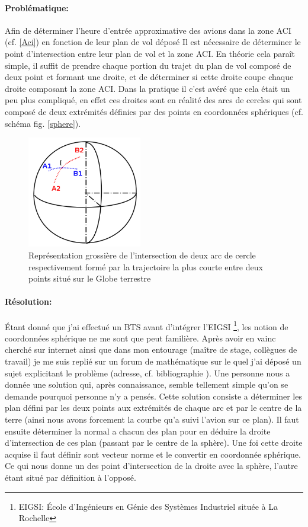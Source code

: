             \paragraph{Problématique:}
Afin de déterminer l'heure d'entrée approximative des avions dans la zone ACI (cf. \vref{Aci}) en fonction de leur plan de vol déposé Il est nécessaire de déterminer le point d'intersection entre leur plan de vol et la zone ACI. En théorie cela paraît simple, il suffit de prendre chaque portion du trajet du plan de vol composé de deux point et formant une droite, et  de déterminer si cette droite coupe chaque droite composant la zone ACI. Dans la pratique il c'est avéré que cela était un peu plus compliqué, en effet ces droites sont en réalité des arcs de cercles qui sont composé de deux extrémités définies par des points en coordonnées sphériques (cf. schéma fig. \vref{sphere}).
\begin{figure}
    \center
    \includegraphics[width=5cm]{images/Sphere.png}
    \caption{Représentation grossière de l'intersection de deux arc de cercle respectivement formé par la trajectoire la plus courte entre deux points situé sur le Globe terrestre}
    \label{sphere}
\end{figure}
            \paragraph{Résolution:}
Étant donné que j'ai effectué un BTS avant d'intégrer l'EIGSI \footnote{EIGSI: École d'Ingénieurs en Génie des Systèmes Industriel située à La Rochelle}, les notion de coordonnées sphérique ne me sont que peut familière. Après avoir en vainc cherché sur internet ainsi que dans mon entourage  (maître de stage, collègues de travail) je me suis replié sur un forum de mathématique sur le quel j'ai déposé un sujet explicitant le problème (adresse, cf. bibliographie \cite{forummath}). Une personne nous a donnée une solution qui, après connaissance, semble tellement simple qu'on se demande pourquoi personne n'y a pensés. Cette solution consiste a déterminer les plan défini par les deux points aux extrémités de chaque arc et par le centre de la terre (ainsi nous avons forcement la courbe qu'a suivi l'avion sur ce plan). Il faut ensuite déterminer la normal a chacun des plan pour en déduire la droite d'intersection de ces plan (passant par le centre de la sphère). Une foi cette droite acquise il faut définir sont vecteur norme et le convertir en coordonnée sphérique. Ce qui nous donne un des point d'intersection de la droite avec la sphère, l'autre étant situé par définition à l'opposé.

